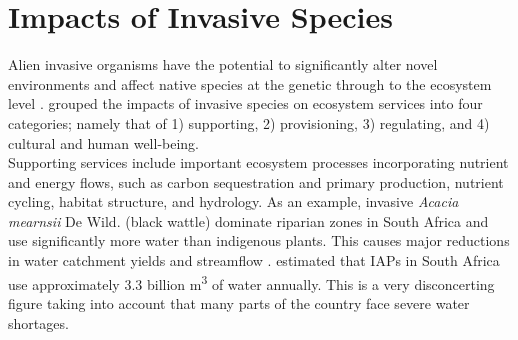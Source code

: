 \section{Impacts of Invasive Species}
 
Alien invasive organisms have the potential to significantly alter novel environments and affect native species at the genetic through to the ecosystem level \citep{Thompson1991, Crooks, Lockwood2013}.  \citet{Vila2017} grouped the impacts of invasive species on ecosystem services into four categories; namely that of 1) supporting, 2) provisioning, 3) regulating, and 4) cultural and human well-being. \\
Supporting services include important ecosystem processes incorporating nutrient and energy flows, such as carbon sequestration and primary production, nutrient cycling, habitat structure, and hydrology. As an example, invasive \textit{Acacia mearnsii} De Wild. (black wattle) dominate riparian zones in South Africa and use significantly more water than indigenous plants. This causes major reductions in water catchment yields and streamflow \citep{Maitre2000, Dye2004}. \citet{Maitre2000} estimated that IAPs in South Africa use approximately 3.3 billion m\textsuperscript{3} of water annually. This is a very disconcerting figure taking into account that many parts of the country face severe water shortages. \\

